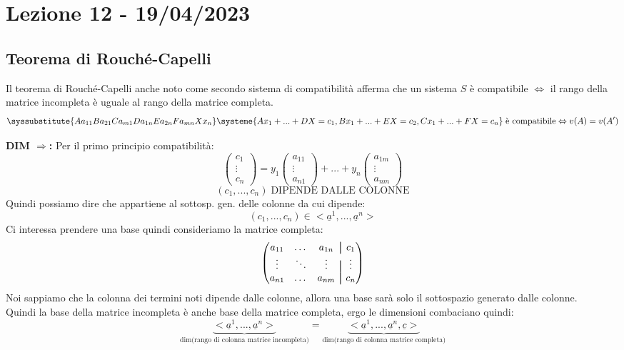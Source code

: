 \section{Lezione 12 - 19/04/2023}

\subsection{Teorema di Rouché-Capelli}
Il teorema di Rouché-Capelli anche noto come secondo sistema di compatibilità afferma che un sistema $S$ è compatibile $\Leftrightarrow$ il rango della matrice incompleta è uguale al rango della matrice completa.
$$
\syssubstitute{A{a_{11}}B{a_{21}}C{a_{m1}}D{a_{1n}}E{a_{2n}}F{a_{mn}}X{x_{n}}}
\systeme{
  A x_1 +...+ D X  = c_1,
  B x_1 +...+ E X = c_2,
  C x_1 +...+ F X = c_n
}
\; \text{è compatibile} \Leftrightarrow
v(A) = v(A^{\prime})
$$

\textbf{DIM $\Rightarrow$:}
Per il primo principio compatibilità:
$$ 
\begin{pmatrix}
c_1 \\ \vdots \\ c_n
\end{pmatrix}
=
y_1 \begin{pmatrix}
a_{11} \\ \vdots \\ a_{n1}
\end{pmatrix}
+...+
y_n \begin{pmatrix}
a_{1m} \\ \vdots \\ a_{nm}
\end{pmatrix}
$$
$$ (c_1,...,c_n) \; \text{DIPENDE DALLE COLONNE}$$
Quindi possiamo dire che appartiene al sottosp. gen. delle colonne da cui dipende:
$$ (c_1,...,c_n) \in <\underline{a}^1,...,\underline{a}^n> $$
Ci interessa prendere una base quindi consideriamo la matrice completa:
$$
\begin{pmatrix}
a_{11} & \dots & a_{1n} &\aug& c_1 \\
\vdots & \ddots & \vdots &\aug& \vdots \\
a_{n1} & \dots & a_{nm} &\aug& c_n 
\end{pmatrix}
$$
Noi sappiamo che la colonna dei termini noti dipende dalle colonne, allora una base sarà solo il sottospazio generato dalle colonne.\\
Quindi la base della matrice incompleta è anche base della matrice completa, ergo le dimensioni combaciano quindi:
$$ \underbrace{<\underline{a}^1,...,\underline{a}^n>}_\text{dim(rango di colonna matrice incompleta)} = \underbrace{<\underline{a}^1,...,\underline{a}^n, \underline{c}>}_\text{dim(rango di colonna matrice completa)}$$

